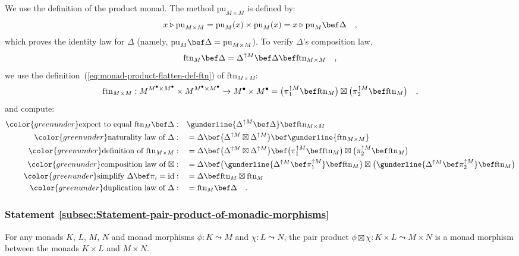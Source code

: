 We use the definition of the product monad. The method $\text{pu}_{M\times M}$
is defined by:
\[
x\triangleright\text{pu}_{M\times M}=\text{pu}_{M}(x)\times\text{pu}_{M}(x)=x\triangleright\text{pu}_{M}\bef\Delta\quad,
\]
which proves the identity law for $\Delta$ (namely, $\text{pu}_{M}\bef\Delta=\text{pu}_{M\times M}$).
To verify $\Delta$\textsf{'}s composition law, 
\[
\text{ftn}_{M}\bef\Delta=\Delta^{\uparrow M}\bef\Delta\bef\text{ftn}_{M\times M}\quad,
\]
we use the definition~(\ref{eq:monad-product-flatten-def-ftn}) of
$\text{ftn}_{M\times M}$:
\[
\text{ftn}_{M\times M}:M^{M^{\bullet}\times M^{\bullet}}\times M^{M^{\bullet}\times M^{\bullet}}\rightarrow M^{\bullet}\times M^{\bullet}=\big(\pi_{1}^{\uparrow M}\bef\text{ftn}_{M}\big)\boxtimes\big(\pi_{2}^{\uparrow M}\bef\text{ftn}_{M}\big)\quad,
\]
and compute:
\begin{align*}
{\color{greenunder}\text{expect to equal }\text{ftn}_{M}\bef\Delta:}\quad & \gunderline{\Delta^{\uparrow M}\bef\Delta}\bef\text{ftn}_{M\times M}\\
{\color{greenunder}\text{naturality law of }\Delta:}\quad & =\Delta\bef\big(\Delta^{\uparrow M}\boxtimes\Delta^{\uparrow M}\big)\bef\gunderline{\text{ftn}_{M\times M}}\\
{\color{greenunder}\text{definition of }\text{ftn}_{M\times M}:}\quad & =\Delta\bef\big(\Delta^{\uparrow M}\boxtimes\Delta^{\uparrow M}\big)\bef\big(\pi_{1}^{\uparrow M}\bef\text{ftn}_{M}\big)\boxtimes\big(\pi_{2}^{\uparrow M}\bef\text{ftn}_{M}\big)\\
{\color{greenunder}\text{composition law of }\boxtimes:}\quad & =\Delta\bef\big(\gunderline{\Delta^{\uparrow M}\bef\pi_{1}^{\uparrow M}}\bef\text{ftn}_{M}\big)\boxtimes\big(\gunderline{\Delta^{\uparrow M}\bef\pi_{2}^{\uparrow M}}\bef\text{ftn}_{M}\big)\\
{\color{greenunder}\text{simplify }\Delta\bef\pi_{i}=\text{id}:}\quad & =\Delta\bef\text{ftn}_{M}\boxtimes\text{ftn}_{M}\\
{\color{greenunder}\text{duplication law of }\Delta:}\quad & =\text{ftn}_{M}\bef\Delta\quad.
\end{align*}


\subsubsection{Statement \label{subsec:Statement-pair-product-of-monadic-morphisms}\ref{subsec:Statement-pair-product-of-monadic-morphisms}}

For any monads $K$, $L$, $M$, $N$ and monad morphisms $\phi:K\leadsto M$
and $\chi:L\leadsto N$, the pair product $\phi\boxtimes\chi:K\times L\leadsto M\times N$
is a monad morphism between the monads $K\times L$ and $M\times N$.

